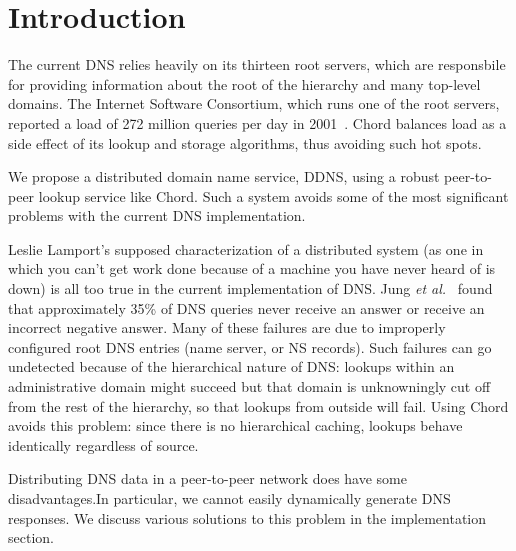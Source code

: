 \section{Introduction}

The current DNS relies heavily on its
thirteen root servers, which are responsbile for providing
information about the root of the hierarchy and many top-level domains.
The Internet Software Consortium, which runs one of the root servers,
reported a load of 272 million queries per day in 2001~\cite{isc-root}.
Chord balances load as a side effect of its lookup and storage 
algorithms, thus avoiding such hot spots.

We propose a distributed domain name service, DDNS,
using a robust peer-to-peer lookup service like Chord.
Such a system avoids some of the most significant
problems with the current DNS implementation.
 
Leslie Lamport's supposed characterization of a
distributed system (as one in which you can't get work
done because of a machine you have never heard of is down)
is all too true in the current implementation of {DNS}.
Jung {\it et al.}~\cite{dnscache:sigcommimw01} found that approximately
35\% of DNS queries never receive an answer or receive
an incorrect negative answer.
Many of these failures are due to improperly configured
root DNS entries (name server, or NS records).
Such failures can go undetected because of the hierarchical
nature of DNS: lookups within an administrative domain might
succeed but that domain is unknowningly cut off from the rest
of the hierarchy, so that lookups from outside will fail.
Using Chord avoids this problem: since there is no hierarchical
caching, lookups behave identically regardless of source.

Distributing DNS data in a peer-to-peer network does have some
disadvantages.In particular, we cannot easily dynamically 
generate DNS responses. We discuss various solutions to 
this problem in the implementation section.


